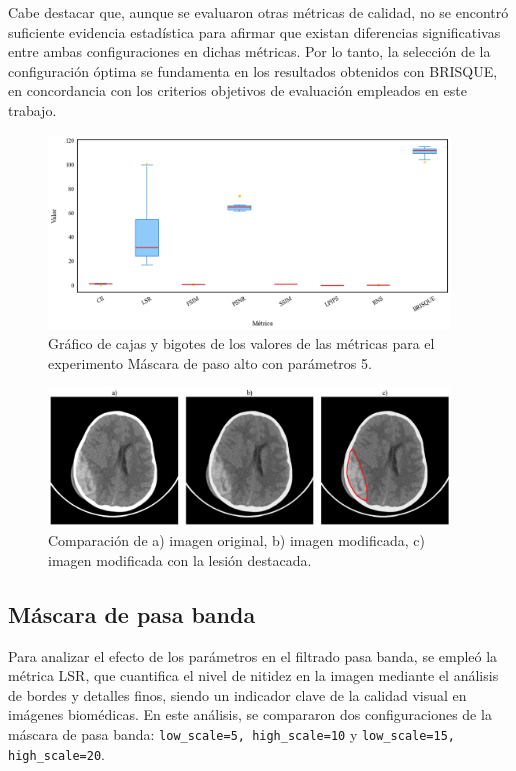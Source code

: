Cabe destacar que, aunque se evaluaron otras métricas de calidad, no se encontró suficiente evidencia estadística para afirmar que existan diferencias significativas entre ambas configuraciones en dichas métricas. Por lo tanto, la selección de la configuración óptima se fundamenta en los resultados obtenidos con BRISQUE, en concordancia con los criterios objetivos de evaluación empleados en este trabajo.

\begin{figure}[H]
    \centering
    \includegraphics[width=0.95\textwidth]{Graphics/boxplot-highpass-mask.png}
    \caption{Gráfico de cajas y bigotes de los valores de las métricas para el experimento Máscara de paso alto con parámetros 5.}
    \label{fig:boxplot-highpass}
\end{figure}

\begin{figure}[H]
    \centering
    \includegraphics[width=0.95\textwidth]{Graphics/comparison-highpass.png}
    \caption{Comparación de a) imagen original, b) imagen modificada, c) imagen modificada con la lesión destacada.}
    \label{fig:comparison-highpass}
\end{figure}

\subsection{Máscara de pasa banda}

Para analizar el efecto de los parámetros en el filtrado pasa banda, se empleó la métrica LSR, que cuantifica el nivel de nitidez en la imagen mediante el análisis de bordes y detalles finos, siendo un indicador clave de la calidad visual en imágenes biomédicas. En este análisis, se compararon dos configuraciones de la máscara de pasa banda: \texttt{low\_scale=5, high\_scale=10} y \texttt{low\_scale=15, high\_scale=20}.

